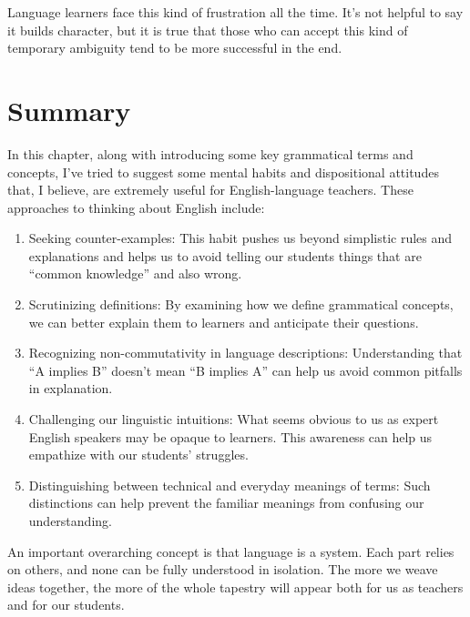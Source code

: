 Language learners face this kind of frustration all the time. It's not helpful to say it builds character, but it is true that those who can accept this kind of temporary ambiguity tend to be more successful in the end.

\section{Summary}
In this chapter, along with introducing some key grammatical terms and concepts, I've tried to suggest some mental habits and dispositional attitudes that, I believe, are extremely useful for English-language teachers. These approaches to thinking about English include:
\begin{enumerate}[noitemsep]
    \item Seeking counter-examples: This habit pushes us beyond simplistic rules and explanations and helps us to avoid telling our students things that are \enquote{common knowledge} and also wrong.
    \item Scrutinizing definitions: By examining how we define grammatical concepts, we can better explain them to learners and anticipate their questions.
    \item Recognizing non-commutativity in language descriptions: Understanding that \enquote{A implies B} doesn't mean \enquote{B implies A} can help us avoid common pitfalls in explanation.
    \item Challenging our linguistic intuitions: What seems obvious to us as expert English speakers may be opaque to learners. This awareness can help us empathize with our students' struggles.
    \item Distinguishing between technical and everyday meanings of terms: Such distinctions can help prevent the familiar meanings from confusing our understanding.
\end{enumerate}

An important overarching concept is that language is a system. Each part relies on others, and none can be fully understood in isolation. The more we weave ideas together, the more of the whole tapestry will appear both for us as teachers and for our students.



